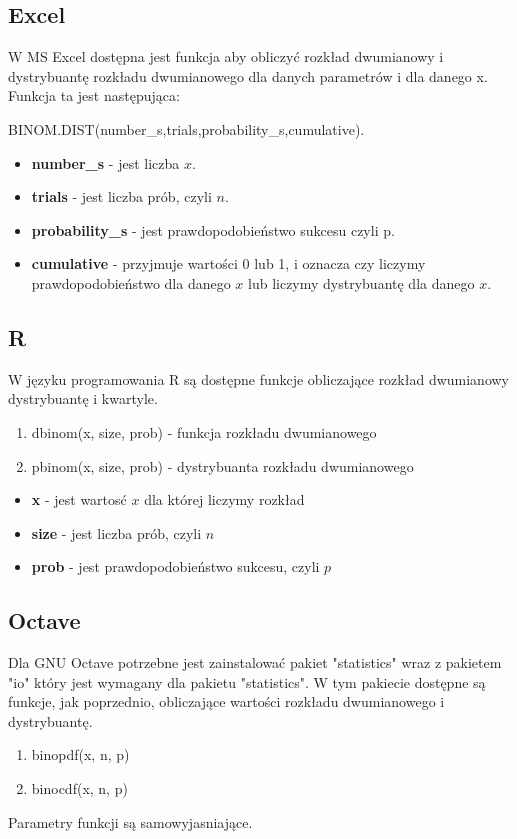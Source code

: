 \documentclass{article}
\begin{document}
\subsection{Excel}
W MS Excel dostępna jest funkcja aby obliczyć rozkład dwumianowy i dystrybuantę rozkładu dwumianowego dla danych parametrów i dla danego x. Funkcja ta jest następująca:
\begin{center}
BINOM.DIST(number\_s,trials,probability\_s,cumulative).
\end{center}
\begin{itemize}
\item\textbf{number\_s} - jest liczba $x$. 
\item\textbf{trials} - jest liczba prób, czyli $n$. 
\item\textbf{probability\_s} - jest prawdopodobieństwo sukcesu czyli p. 
\item\textbf{cumulative} - przyjmuje wartości 0 lub 1, i oznacza czy liczymy prawdopodobieństwo dla danego $x$ lub liczymy dystrybuantę dla danego $x$. 
\end{itemize}

\subsection{R}
W języku programowania R są dostępne funkcje obliczające rozkład dwumianowy dystrybuantę i kwartyle. 
\begin{enumerate}
\item dbinom(x, size, prob) - funkcja rozkładu dwumianowego
\item pbinom(x, size, prob) - dystrybuanta rozkładu dwumianowego
\end{enumerate}
\begin{itemize}
\item\textbf{x} - jest wartosć $x$ dla której liczymy rozkład 
\item\textbf{size} - jest liczba prób, czyli $n$ 
\item\textbf{prob} - jest prawdopodobieństwo sukcesu, czyli $p$ 
\end{itemize}

\subsection{Octave}
Dla GNU Octave potrzebne jest zainstalować pakiet "statistics" wraz z pakietem "io" który jest wymagany dla pakietu "statistics". W tym pakiecie dostępne są funkcje, jak poprzednio, obliczające wartości rozkładu dwumianowego i dystrybuantę.
\begin{enumerate}
\item binopdf(x, n, p)
\item binocdf(x, n, p)
\end{enumerate}
Parametry funkcji są samowyjasniające.
\end{document}

